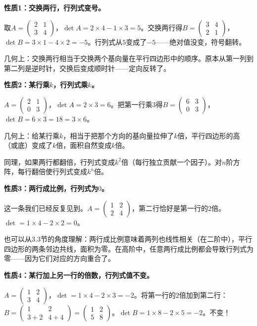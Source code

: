 \vspace{0.2cm}
\noindent\textbf{性质1：交换两行，行列式变号。}

取$A=\begin{pmatrix}2&1\\3&4\end{pmatrix}$，$\det A=2\times4-1\times3=5$。交换两行得$B=\begin{pmatrix}3&4\\2&1\end{pmatrix}$，$\det B=3\times1-4\times2=-5$。行列式从$5$变成了$-5$——绝对值没变，符号翻转。

几何上：交换两行相当于交换两个基向量在平行四边形中的顺序。原本从第一列到第二列是逆时针，交换后变成顺时针——定向反转了。

\vspace{0.2cm}
\noindent\textbf{性质2：某行乘$k$，行列式乘$k$。}

$A=\begin{pmatrix}2&1\\0&3\end{pmatrix}$，$\det A=2\times3=6$。把第一行乘$3$得$B=\begin{pmatrix}6&3\\0&3\end{pmatrix}$，$\det B=6\times3=18=3\times6$。

几何上：给某行乘$k$，相当于把那个方向的基向量拉伸了$k$倍，平行四边形的高（或底）变成了$k$倍，面积自然变成$k$倍。

同理，如果两行都翻倍，行列式变成$k^2$倍（每行独立贡献一个因子）。对$n$阶方阵，每行翻倍使行列式变成$k^n$倍。

\vspace{0.2cm}
\noindent\textbf{性质3：两行成比例，行列式为$0$。}

这一条我们已经反复见到。$A=\begin{pmatrix}1&2\\2&4\end{pmatrix}$，第二行恰好是第一行的$2$倍。$\det=1\times4-2\times2=0$。

也可以从3.3节的角度理解：两行成比例意味着两列也线性相关（在二阶中），平行四边形的两条邻边共线，面积为零。在高阶中，任意两行成比例都会导致行列式为零——因为它们对应的方向重合了。

\vspace{0.2cm}
\noindent\textbf{性质4：某行加上另一行的倍数，行列式值不变。}

$A=\begin{pmatrix}1&2\\3&4\end{pmatrix}$，$\det=1\times4-2\times3=-2$。将第一行的$2$倍加到第二行：$B=\begin{pmatrix}1&2\\3+2&4+4\end{pmatrix}=\begin{pmatrix}1&2\\5&8\end{pmatrix}$。$\det B=1\times8-2\times5=-2$。不变！


